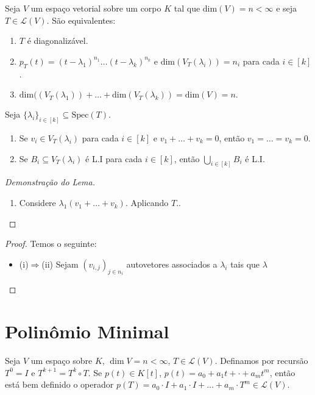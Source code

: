 \documentclass[11pt,twoside,a4paper]{book}
\begin{document}
\begin{teorema}
Seja \(V\) um espaço vetorial sobre um corpo \(K\) tal que \(\text{dim}(V)=n<\infty\) e seja \(T\in\mathcal{L}(V)\). São equivalentes:
\begin{enumerate}
    \item \(T\) é diagonalizável.
    \item \(p_T(t)=(t-\lambda_1)^{n_1}\ldots(t-\lambda_k)^{n_k}\) e \(\text{dim}(V_T(\lambda_i))=n_i\) para cada \(i\in [k]\).
    \item\(\text{dim}((V_T(\lambda_1))+\ldots+\text{dim}(V_T(\lambda_k))=\text{dim}(V)=n.\)
\end{enumerate}
\end{teorema}
\begin{lema}
Seja \(\{\lambda_i\}_{i\in [k]}\subseteq\text{Spec}(T).\)
\begin{enumerate}
    \item Se \(v_i \in V_T(\lambda_i)\) para cada \(i\in [k]\) e \(v_1+\ldots+v_k=0\), então \(v_1=\ldots=v_k=0\).
    \item Se \(B_i\subseteq V_T(\lambda_i)\) é L.I para cada \(i\in [k]\), então \(\bigcup_{i\in [k]}B_i\) é L.I.
\end{enumerate}
\end{lema}
\begin{proof}[Demonstração do Lema]
\begin{enumerate}
    \item Considere \(\lambda_1(v_1+\ldots+v_k)\). Aplicando \(T\)..
\end{enumerate}
\end{proof}

\begin{proof}
Temos o seguinte:
\begin{itemize}
\item (i)$\Rightarrow$(ii) Sejam $(v_{i,j})_{j\in n_i}$ autovetores associados a $\lambda_i$ tais que $\lambda$ 
\end{itemize}
\end{proof}

\section{Polinômio Minimal}

\begin{definicao}
Seja $V$ um espaço sobre $K$, $\dim V=n<\infty$, $T\in\mathcal{L}(V)$. Definamos por recursão $T^0=I$ e $T^{k+1}=T^k\circ T$. Se $p(t)\in K[t]$, $p(t)=a_0+a_1t+\cdot+a_mt^m$, então está bem definido o operador $p(T)=a_0\cdot I+a_1\cdot I+\dots+a_m\cdot T^m\in\mathcal{L}(V)$.
\end{definicao}
\end{document}
